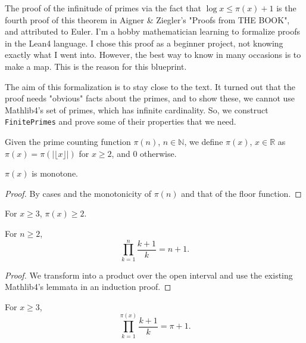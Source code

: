 The proof of the infinitude of primes via the fact that $\log x\le \pi(x)+1$ is the fourth proof of this theorem in Aigner \& Ziegler's "Proofs from THE BOOK", and attributed to Euler. I'm a hobby mathematician learning to formalize proofs in the Lean4 language. I chose this proof as a beginner project, not knowing exactly what I went into. However,  the best way to know in many occasions is to make a map. This is the reason for this blueprint. 

The aim of this formalization is to stay close to the text. It turned out that the proof needs "obvious" facts about the primes, and to show these, we cannot use Mathlib4's set of primes, which has infinite cardinality. So, we construct \texttt{FinitePrimes} and prove some of their properties that we need.

\begin{definition-pre}
\label{def:piReal}
Given the prime counting function $\pi(n)$, $n\in\mathbb{N}$, we define $\pi(x)$, $x\in\mathbb{R}$ as $\pi(x) = \pi(|\lfloor x\rfloor|)$ for $x\ge2$, and $0$ otherwise.
\end{definition-pre}

\begin{lemma}
\label{lem:lemma5-2-1}
\leanok
$\pi(x)$ is monotone.
\end{lemma}
\begin{proof}
\leanok
By cases and the monotonicity of $\pi(n)$ and that of the floor function.
\end{proof}

\begin{lemma}
\label{lem:lemma5-2}
\leanok
For $x\ge3$, $\pi(x)\ge2$.
\end{lemma}

\begin{lemma}
\label{lem:lemma5-1}
\leanok
For $n\ge2$,
    $$\prod_{k=1}^{n}\frac{k+1}{k} = n+1.$$
\end{lemma}
\begin{proof}
\leanok
We transform into a product over the open interval and use the existing Mathlib4's lemmata in an induction proof.
\end{proof}

\begin{lemma}
\label{lem:lemma5}
\leanok
For $x\ge3$,
    $$\prod_{k=1}^{\pi(x)}\frac{k+1}{k} = \pi+1.$$
\end{lemma}

